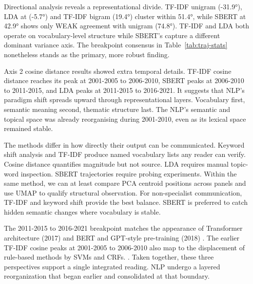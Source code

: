 Directional analysis reveals a representational divide. TF-IDF unigram (-31.9°), LDA at (-5.7°) and TF-IDF bigram (19.4°) cluster within 51.4°, while SBERT at 42.9° shows only WEAK agreement with unigram (74.8°). TF-IDF and LDA both operate on vocabulary-level structure while SBERT's capture a different dominant variance axis. The breakpoint consensus in Table~\ref{tab:traj-stats} nonetheless stands as the primary, more robust finding.

Axis 2 cosine distance results showed extra temporal details. TF-IDF cosine distance reaches its peak at 2001-2005 to 2006-2010, SBERT peaks at 2006-2010 to 2011-2015, and LDA peaks at 2011-2015 to 2016-2021. It suggests that NLP's paradigm shift spreads upward through representational layers. Vocabulary first, semantic meaning second, thematic structure last. The NLP's semantic and topical space was already reorganising during 2001-2010, even as its lexical space remained stable.

The methods differ in how directly their output can be communicated. Keyword shift analysis and TF-IDF produce named vocabulary lists any reader can verify. Cosine distance quantifies magnitude but not source. LDA requires manual topic-word inspection. SBERT trajectories require probing experiments. Within the same method, we can at least compare PCA centroid positions across panels and use UMAP to qualify structural observation. For non-specialist communication, TF-IDF and keyword shift provide the best balance. SBERT is preferred to catch hidden semantic changes where vocabulary is stable. 

The 2011-2015 to 2016-2021 breakpoint matches the appearance of Transformer architecture (2017) and BERT and GPT-style pre-training (2018) \citep{pramanick_diachronic_2023, hall_studying_2008}. The earlier TF-IDF cosine peaks at 2001-2005 to 2006-2010 also map to the displacement of rule-based methods by SVMs and CRFs. \citep{hall_studying_2008}. Taken together, these three perspectives support a single integrated reading. NLP undergo a layered reorganization that began earlier and consolidated at that boundary. 

